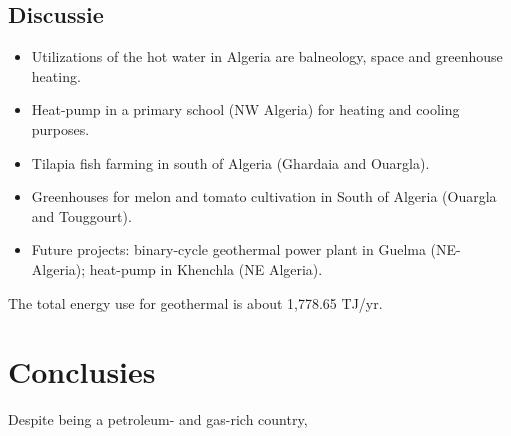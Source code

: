 \documentclass[a0,portrait]{a0poster}
\begin{document}
\begin{multicols}{3}
\subsection*{Discussie}
\begin{itemize}
\item Utilizations of the hot water in Algeria are balneology, space and greenhouse heating. 
\item Heat-pump in a primary school (NW Algeria) for heating and cooling purposes.
\item Tilapia fish farming in south of Algeria (Ghardaia and Ouargla).
\item Greenhouses for melon and tomato cultivation in South of Algeria (Ouargla and Touggourt).
\item Future projects: binary-cycle geothermal power plant in Guelma (NE-Algeria); heat-pump in Khenchla (NE Algeria).
\end{itemize}
The total energy use for geothermal is about 1,778.65 TJ/yr.






\color{SaddleBrown} %

\section*{Conclusies}
Despite being a petroleum- and gas-rich country, 
\color{Black} %







\end{multicols}
\end{document}
